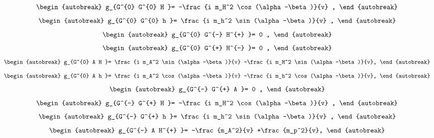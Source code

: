 \begin{align}
\begin{autobreak}
g_{G^{0} G^{0} H }=
	-\frac{i m_H^2 \cos (\alpha -\beta )}{v}
	,
\end{autobreak}
\end{align}
\begin{align}
\begin{autobreak}
g_{G^{0} G^{0} h }=
	\frac{i m_h^2 \sin (\alpha -\beta )}{v}
	,
\end{autobreak}
\end{align}
\begin{align}
\begin{autobreak}
g_{G^{0} G^{-} H^{+} }=
	0
	,
\end{autobreak}
\end{align}
\begin{align}
\begin{autobreak}
g_{G^{0} G^{+} H^{-} }=
	0
	,
\end{autobreak}
\end{align}
\begin{align}
\begin{autobreak}
g_{G^{0} A H }=
	\frac{i m_A^2 \sin (\alpha -\beta )}{v}
	-\frac{i m_H^2 \sin (\alpha -\beta )}{v},
\end{autobreak}
\end{align}
\begin{align}
\begin{autobreak}
g_{G^{0} A h }=
	\frac{i m_A^2 \cos (\alpha -\beta )}{v}
	-\frac{i m_h^2 \cos (\alpha -\beta )}{v},
\end{autobreak}
\end{align}
\begin{align}
\begin{autobreak}
g_{G^{-} G^{+} A }=
	0
	,
\end{autobreak}
\end{align}
\begin{align}
\begin{autobreak}
g_{G^{-} G^{+} H }=
	-\frac{i m_H^2 \cos (\alpha -\beta )}{v}
	,
\end{autobreak}
\end{align}
\begin{align}
\begin{autobreak}
g_{G^{-} G^{+} h }=
	\frac{i m_h^2 \sin (\alpha -\beta )}{v}
	,
\end{autobreak}
\end{align}
\begin{align}
\begin{autobreak}
g_{G^{-} A H^{+} }=
	-\frac{m_A^2}{v}
	+\frac{m_p^2}{v},
\end{autobreak}
\end{align}
